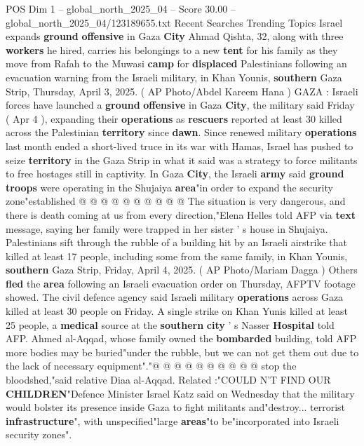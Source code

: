 \begin{textsample}{POS Dim 1 – global\_north\_2025\_04 – Score 30.00 – global\_north\_2025\_04/123189655.txt}  \label{ex:f1_pos_350}
Recent Searches Trending Topics Israel expands \textbf{ground} \textbf{offensive} in Gaza \textbf{City} Ahmad Qishta, 32, along with three \textbf{workers} he hired, carries his belongings to a new \textbf{tent} for his family as they move from Rafah to the Muwasi \textbf{camp} for \textbf{displaced} Palestinians following an evacuation warning from the Israeli military, in Khan Younis, \textbf{southern} Gaza Strip, Thursday, April 3, 2025. ( AP Photo/Abdel Kareem Hana ) GAZA : Israeli forces have launched a \textbf{ground} \textbf{offensive} in Gaza \textbf{City}, the military said Friday ( Apr 4 ), expanding their \textbf{operations} as \textbf{rescuers} reported at least 30 killed across the Palestinian \textbf{territory} since \textbf{dawn}.
Since renewed military \textbf{operations} last month ended a short-lived truce in its war with Hamas, Israel has pushed to seize \textbf{territory} in the Gaza Strip in what it said was a strategy to force militants to free hostages still in captivity.
In Gaza \textbf{City}, the Israeli \textbf{army} said \textbf{ground} \textbf{troops} were operating in the Shujaiya \textbf{area}"in order to expand the security zone"established @ @ @ @ @ @ @ @ @ @ The situation is very dangerous, and there is death coming at us from every direction,"Elena Helles told AFP via \textbf{text} message, saying her family were trapped in her sister ' s house in Shujaiya.
Palestinians sift through the rubble of a building hit by an Israeli airstrike that killed at least 17 people, including some from the same family, in Khan Younis, \textbf{southern} Gaza Strip, Friday, April 4, 2025. ( AP Photo/Mariam Dagga ) Others \textbf{fled} the \textbf{area} following an Israeli evacuation order on Thursday, AFPTV footage showed.
The civil defence agency said Israeli military \textbf{operations} across Gaza killed at least 30 people on Friday.
A single strike on Khan Yunis killed at least 25 people, a \textbf{medical} source at the \textbf{southern} \textbf{city} ' s Nasser \textbf{Hospital} told AFP.
Ahmed al-Aqqad, whose family owned the \textbf{bombarded} building, told AFP more bodies may be buried"under the rubble, but we can not get them out due to the lack of necessary equipment"."@ @ @ @ @ @ @ @ @ @ stop the bloodshed,"said relative Diaa al-Aqqad.
Related :"COULD N'T FIND OUR \textbf{CHILDREN}"Defence Minister Israel Katz said on Wednesday that the military would bolster its presence inside Gaza to fight militants and"destroy... terrorist \textbf{infrastructure}", with unspecified"large \textbf{areas}"to be"incorporated into Israeli security zones".

\end{textsample}
